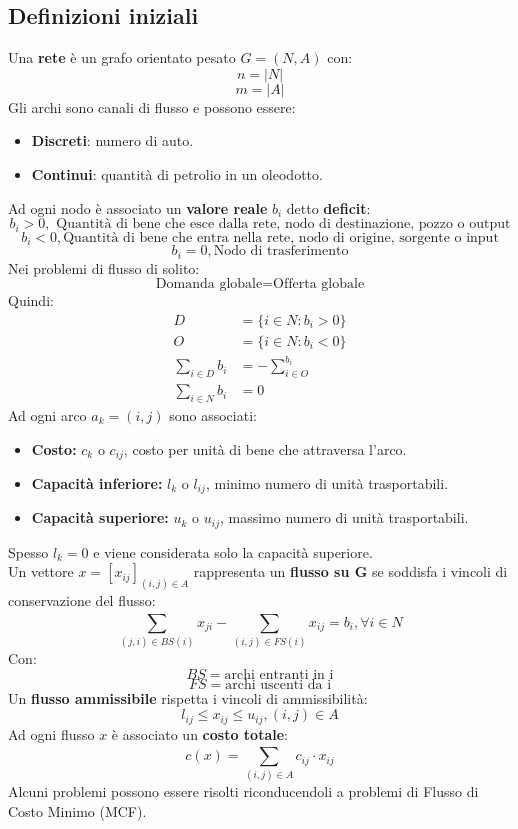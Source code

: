 \documentclass[12pt,a4paper]{article}
\begin{document}
\subsection{Definizioni iniziali}
Una \textbf{rete} è un grafo orientato pesato $G = (N,A)$ con:
\[
n = |N|
\]
\[
m = |A|
\]
Gli archi sono canali di flusso e possono essere:
\begin{itemize}
    \item \textbf{Discreti}: numero di auto.
    \item \textbf{Continui}: quantità di petrolio in un oleodotto.
\end{itemize}
Ad ogni nodo è associato un \textbf{valore reale} $b_i$ detto \textbf{deficit}:
\[
b_i > 0, \text{ Quantità di bene che esce dalla rete, nodo di destinazione, pozzo o output}
\] 
\[
b_i < 0, \text{Quantità di bene che entra nella rete, nodo di origine, sorgente o input}
\]
\[
b_i = 0, \text{Nodo di trasferimento}
\]
Nei problemi di flusso di solito:
\[
\text{Domanda globale} = \text{Offerta globale} 
\]
Quindi:
\[
\begin{aligned}
    D &= \{i \in N: b_i > 0\}\\
    O &= \{i \in N: b_i < 0\}\\
    \sum_{i \in D}^{} b_i &= - \sum_{i \in O}^{b_i}\\
    \sum_{i \in N}^{} b_i &= 0
\end{aligned}
\]
Ad ogni arco $a_k = (i,j)$ sono associati:
\begin{itemize}
    \item \textbf{Costo:} $c_k$ o $c_{ij}$, costo per unità di bene che attraversa l'arco.
    \item \textbf{Capacità inferiore:} $l_k$ o $l_{ij}$, minimo numero di unità trasportabili.
    \item\textbf{Capacità superiore:} $u_k$ o $u_{ij}$, massimo numero di unità trasportabili.
\end{itemize}
Spesso $l_k = 0$ e viene considerata solo la capacità superiore.\\
Un vettore $x = [x_{ij}]_{(i,j) \in A}$ rappresenta un \textbf{flusso su G} se soddisfa i vincoli di conservazione del flusso:
\[
\sum_{(j,i) \in BS(i)}^{} x_{ji} - \sum_{(i,j) \in FS(i)}^{} x_{ij} = b_i, \forall i \in N
\]
Con:
\[
BS = \text{archi entranti in i}
\]
\[
FS = \text{archi uscenti da i}
\]
Un \textbf{flusso ammissibile} rispetta i vincoli di ammissibilità:
\[
l_{ij} \leq x_{ij} \leq u_{ij}, (i,j) \in A
\]
Ad ogni flusso $x$ è associato un \textbf{costo totale}:
\[
c(x) = \sum_{(i,j) \in A}^{} c_{ij} \cdot x_{ij}
\]
Alcuni problemi possono essere risolti riconducendoli a problemi di Flusso di Costo Minimo (MCF).
\end{document}
